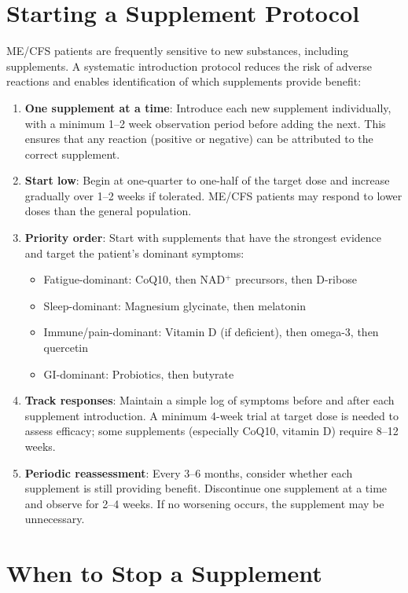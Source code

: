 \section{Starting a Supplement Protocol}
\label{sec:starting-protocol}

ME/CFS patients are frequently sensitive to new substances, including supplements. A systematic introduction protocol reduces the risk of adverse reactions and enables identification of which supplements provide benefit:

\begin{enumerate}
    \item \textbf{One supplement at a time}: Introduce each new supplement individually, with a minimum 1--2 week observation period before adding the next. This ensures that any reaction (positive or negative) can be attributed to the correct supplement.
    \item \textbf{Start low}: Begin at one-quarter to one-half of the target dose and increase gradually over 1--2 weeks if tolerated. ME/CFS patients may respond to lower doses than the general population.
    \item \textbf{Priority order}: Start with supplements that have the strongest evidence and target the patient's dominant symptoms:
    \begin{itemize}
        \item Fatigue-dominant: CoQ10, then NAD$^+$ precursors, then D-ribose
        \item Sleep-dominant: Magnesium glycinate, then melatonin
        \item Immune/pain-dominant: Vitamin D (if deficient), then omega-3, then quercetin
        \item GI-dominant: Probiotics, then butyrate
    \end{itemize}
    \item \textbf{Track responses}: Maintain a simple log of symptoms before and after each supplement introduction. A minimum 4-week trial at target dose is needed to assess efficacy; some supplements (especially CoQ10, vitamin D) require 8--12 weeks.
    \item \textbf{Periodic reassessment}: Every 3--6 months, consider whether each supplement is still providing benefit. Discontinue one supplement at a time and observe for 2--4 weeks. If no worsening occurs, the supplement may be unnecessary.
\end{enumerate}

\section{When to Stop a Supplement}
\label{sec:when-to-stop}

